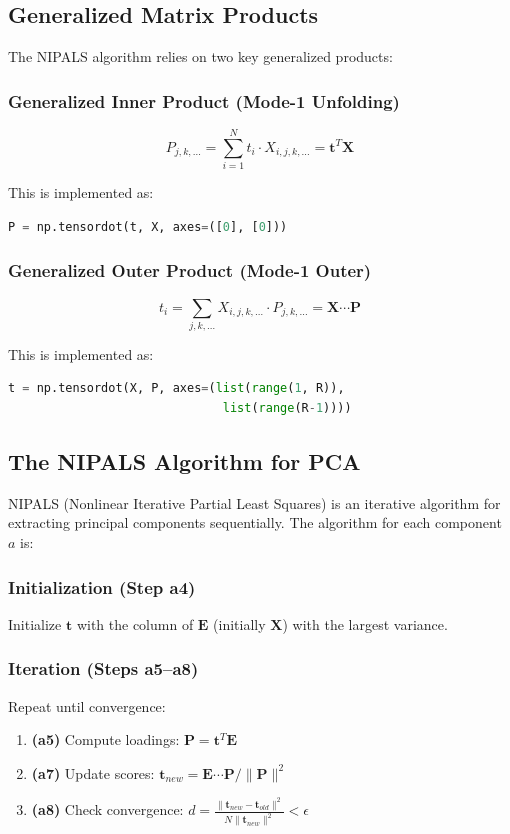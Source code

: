 \documentclass[12pt,a4paper]{article}
\begin{document}
\subsection{Generalized Matrix Products}

The NIPALS algorithm relies on two key generalized products:

\subsubsection{Generalized Inner Product (Mode-1 Unfolding)}
$$P_{j,k,\ldots} = \sum_{i=1}^{N} t_i \cdot X_{i,j,k,\ldots} = \mathbf{t}^T \mathbf{X}$$

This is implemented as:
\begin{lstlisting}[language=Python]
P = np.tensordot(t, X, axes=([0], [0]))
\end{lstlisting}

\subsubsection{Generalized Outer Product (Mode-1 Outer)}
$$t_i = \sum_{j,k,\ldots} X_{i,j,k,\ldots} \cdot P_{j,k,\ldots} = \mathbf{X} \cdots \mathbf{P}$$

This is implemented as:
\begin{lstlisting}[language=Python]
t = np.tensordot(X, P, axes=(list(range(1, R)),
                              list(range(R-1))))
\end{lstlisting}

\subsection{The NIPALS Algorithm for PCA}

NIPALS (Nonlinear Iterative Partial Least Squares) is an iterative algorithm for extracting principal components sequentially. The algorithm for each component $a$ is:

\subsubsection{Initialization (Step a4)}
Initialize $\mathbf{t}$ with the column of $\mathbf{E}$ (initially $\mathbf{X}$) with the largest variance.

\subsubsection{Iteration (Steps a5--a8)}
Repeat until convergence:
\begin{enumerate}
    \item \textbf{(a5)} Compute loadings: $\mathbf{P} = \mathbf{t}^T \mathbf{E}$
    \item \textbf{(a7)} Update scores: $\mathbf{t}_{new} = \mathbf{E} \cdots \mathbf{P} / \|\mathbf{P}\|^2$
    \item \textbf{(a8)} Check convergence: $d = \frac{\|\mathbf{t}_{new} - \mathbf{t}_{old}\|^2}{N \|\mathbf{t}_{new}\|^2} < \epsilon$
\end{enumerate}
\end{document}
